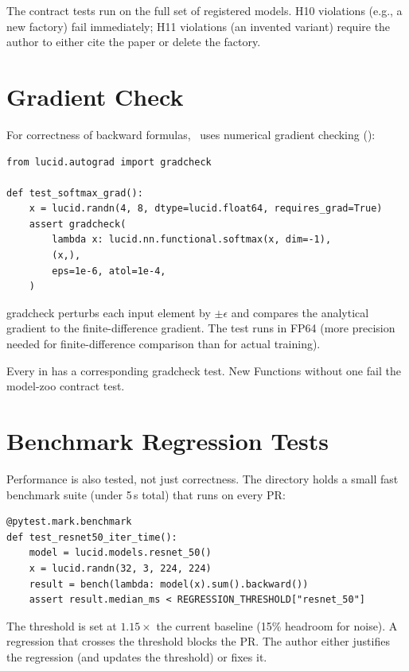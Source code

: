 The contract tests run on the full set of registered models.
H10 violations (e.g., a new  factory) fail
immediately; H11 violations (an invented variant) require the
author to either cite the paper or delete the factory.

\section{Gradient Check}
\label{sec:testing:gradcheck}

For correctness of backward formulas, \Lucid\ uses numerical
gradient checking ():

\begin{lstlisting}[style=lucid,language=LucidPython]
from lucid.autograd import gradcheck

def test_softmax_grad():
    x = lucid.randn(4, 8, dtype=lucid.float64, requires_grad=True)
    assert gradcheck(
        lambda x: lucid.nn.functional.softmax(x, dim=-1),
        (x,),
        eps=1e-6, atol=1e-4,
    )
\end{lstlisting}

gradcheck perturbs each input element by $\pm\epsilon$ and
compares the analytical gradient to the finite-difference
gradient. The test runs in FP64 (more precision needed for
finite-difference comparison than for actual training).

Every  in  has a
corresponding gradcheck test. New Functions without one fail
the model-zoo contract test.

\section{Benchmark Regression Tests}
\label{sec:testing:bench_regression}

Performance is also tested, not just correctness. The
 directory holds a small fast
benchmark suite (under 5\,s total) that runs on every PR:

\begin{lstlisting}[style=lucid,language=LucidPython]
@pytest.mark.benchmark
def test_resnet50_iter_time():
    model = lucid.models.resnet_50()
    x = lucid.randn(32, 3, 224, 224)
    result = bench(lambda: model(x).sum().backward())
    assert result.median_ms < REGRESSION_THRESHOLD["resnet_50"]
\end{lstlisting}

The threshold is set at $1.15 \times$ the current baseline
(15\% headroom for noise). A regression that crosses the
threshold blocks the PR. The author either justifies the
regression (and updates the threshold) or fixes it.

